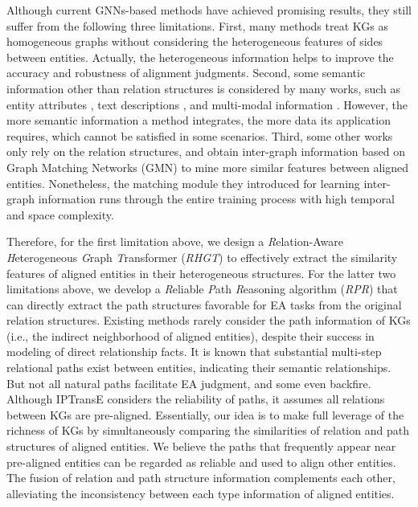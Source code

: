 \documentclass{article}
\begin{document}
Although current GNNs-based methods have achieved promising results, they still suffer from the following three limitations.
First, many methods \cite{wu_relation-aware_2019,sun_knowledge_2020} treat KGs as homogeneous graphs without considering the heterogeneous features of sides between entities. 
Actually, the heterogeneous information helps to improve the accuracy and robustness of alignment judgments.
Second, some semantic information other than relation structures is considered by many works, 
such as entity attributes \cite{liu_exploring_2020,cai_multi-heterogeneous_2022}, 
text descriptions \cite{yang_aligning_2019}, and multi-modal information \cite{liu_visual_2021}.
However, the more semantic information a method integrates, the more data its application requires, which cannot be satisfied in some scenarios. 
Third, some other works \cite{wu_neighborhood_2020,zhu_collective_2020} only rely on the relation structures, and obtain inter-graph information based on Graph Matching Networks (GMN) \cite{li_graph_2019} to mine more similar features between aligned entities.
Nonetheless, the matching module they introduced for learning inter-graph information runs through the entire training process with high temporal and space complexity.


Therefore, for the first limitation above, we design a \textit{R}elation-Aware \textit{H}eterogeneous \textit{G}raph \textit{T}ransformer (\textit{RHGT}) to effectively extract the similarity features of aligned entities in their heterogeneous structures.
For the latter two limitations above, we develop a \textit{R}eliable \textit{P}ath \textit{R}easoning algorithm (\textit{RPR}) that can directly extract the path structures favorable for EA tasks from the original relation structures.
%
Existing methods rarely consider the path information of KGs (i.e., the indirect neighborhood of aligned entities), despite their success in modeling of direct relationship facts. 
It is known that substantial multi-step relational paths exist between entities, indicating their semantic relationships.
But not all natural paths facilitate EA judgment, and some even backfire.
Although IPTransE \cite{zhu_iterative_2017} considers the reliability of paths, it assumes all relations between KGs are pre-aligned.
Essentially, our idea is to make full leverage of the richness of KGs by simultaneously comparing the similarities of relation and path structures of aligned entities. 
We believe the paths that frequently appear near pre-aligned entities can be regarded as reliable and used to align other entities.
The fusion of relation and path structure information complements each other, alleviating the inconsistency between each type information of aligned entities.
%
\end{document}
